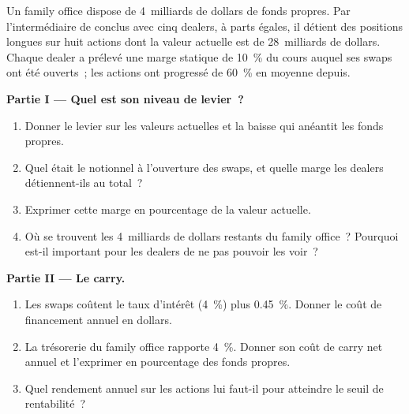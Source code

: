\begin{problem}\label{pb:m1:financing:1}
Un family office dispose de 4~milliards de dollars de fonds propres. Par l'intermédiaire de  conclus avec
cinq dealers, à parts égales, il détient des positions longues sur huit actions dont la
valeur actuelle est de 28~milliards de dollars. Chaque dealer a prélevé une marge statique de 10~\% du
cours auquel ses swaps ont été ouverts~; les actions ont progressé de 60~\% en
moyenne depuis.

\medskip\noindent\textbf{Partie I --- Quel est son niveau de levier~?}
\begin{enumerate}
\item Donner le levier sur les valeurs actuelles et la baisse qui anéantit les
fonds propres.
\item Quel était le notionnel à l'ouverture des swaps, et quelle marge
les dealers détiennent-ils au total~?
\item Exprimer cette marge en pourcentage de la valeur actuelle.
\item Où se trouvent les 4~milliards de dollars restants du family office~? Pourquoi
est-il important pour les dealers de ne pas pouvoir les voir~?
\end{enumerate}

\medskip\noindent\textbf{Partie II --- Le carry.}
\begin{enumerate}[resume]
\item Les swaps coûtent le taux d'intérêt (4~\%) plus 0.45~\%. Donner le coût de financement annuel
en dollars.
\item La trésorerie du family office rapporte 4~\%. Donner son coût de carry net annuel et
l'exprimer en pourcentage des fonds propres.
\item Quel rendement annuel sur les actions lui faut-il pour atteindre le seuil de rentabilité~?
\end{enumerate}


\end{problem}
